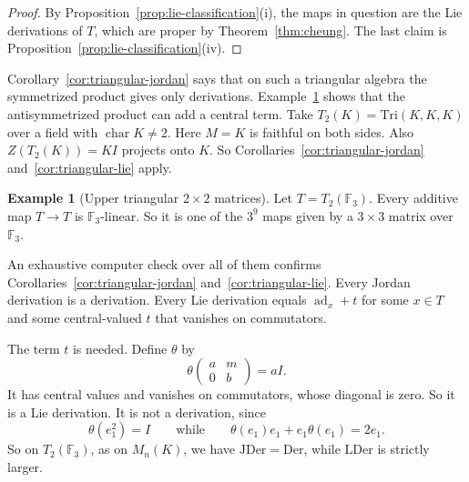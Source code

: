 \documentclass[]{interact}
\theoremstyle{plain}
\theoremstyle{definition}
\newtheorem{example}[theorem]{Example}
\theoremstyle{remark}
\newcommand{\Der}{\mathrm{Der}}
\newcommand{\JDer}{\mathrm{JDer}}
\newcommand{\LDer}{\mathrm{LDer}}
\begin{document}
\begin{proof}
By Proposition~\ref{prop:lie-classification}(i), the maps in question are the Lie derivations of $T$, which are proper by Theorem~\ref{thm:cheung}. The last claim is Proposition~\ref{prop:lie-classification}(iv).
\end{proof}

Corollary~\ref{cor:triangular-jordan} says that on such a triangular algebra the symmetrized product gives only derivations.
Example~\ref{ex:t2} shows that the antisymmetrized product can add a central term.
Take $T_2(K) = \mathrm{Tri}(K,K,K)$ over a field with $\operatorname{char} K \neq 2$.
Here $M = K$ is faithful on both sides.
Also $Z(T_2(K)) = KI$ projects onto $K$.
So Corollaries~\ref{cor:triangular-jordan} and~\ref{cor:triangular-lie} apply.

\begin{example}[Upper triangular $2 \times 2$ matrices]\label{ex:t2}
Let $T = T_2(\mathbb{F}_3)$.
Every additive map $T \to T$ is $\mathbb{F}_3$-linear.
So it is one of the $3^9$ maps given by a $3 \times 3$ matrix over $\mathbb{F}_3$.

An exhaustive computer check over all of them confirms Corollaries~\ref{cor:triangular-jordan} and~\ref{cor:triangular-lie}.
Every Jordan derivation is a derivation.
Every Lie derivation equals $\operatorname{ad}_x + t$ for some $x \in T$ and some central-valued $t$ that vanishes on commutators.

The term $t$ is needed.
Define $\theta$ by
\[
\theta\begin{pmatrix} a & m \\ 0 & b \end{pmatrix} = aI.
\]
It has central values and vanishes on commutators, whose diagonal is zero.
So it is a Lie derivation.
It is not a derivation, since
\[
\theta(e_1^2) = I \qquad \text{while} \qquad \theta(e_1)e_1 + e_1 \theta(e_1) = 2e_1.
\]
So on $T_2(\mathbb{F}_3)$, as on $M_n(K)$, we have $\JDer = \Der$, while $\LDer$ is strictly larger.
\end{example}
\end{document}
